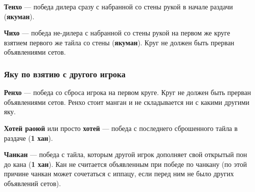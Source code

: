 \textbf{Тенхо} --- победа дилера сразу с набранной со стены рукой в начале раздачи (\textbf{якуман}).

\textbf{Чихо} --- победа не-дилера с набранной со стены рукой на первом же круге взятием первого же тайла со стены (\textbf{якуман}). Круг не должен быть прерван объявлениями сетов.

\subsubsection{Яку по взятию с другого игрока}

\textbf{Ренхо} --- победа со сброса игрока на первом круге. Круг не должен быть прерван объявлениями сетов. Ренхо стоит манган и не складывается ни с какими другими яку.

\textbf{Хотей раоюй} или просто \textbf{хотей} --- победа с последнего сброшенного тайла в раздаче (\textbf{1 хан}).

\textbf{Чанкан} --- победа с тайла, которым другой игрок дополняет свой открытый пон до кана (\textbf{1 хан}). Кан не считается объявленным при победе по чанкану (по этой причине чанкан может сочетаться с иппацу, если перед ним не было других объявлений сетов).

